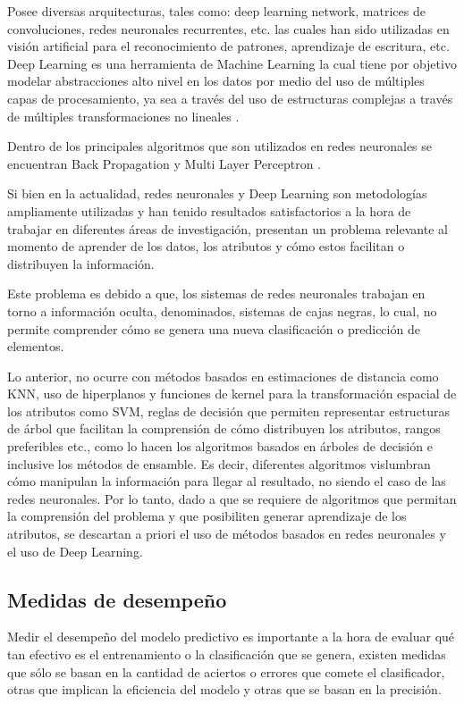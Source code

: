 Posee diversas arquitecturas, tales como: deep learning network, matrices de convoluciones, redes neuronales recurrentes, etc. las cuales han sido utilizadas en visión artificial para el reconocimiento de patrones, aprendizaje de escritura, etc. Deep Learning es una herramienta de Machine Learning la cual tiene por objetivo modelar abstracciones alto nivel en los datos por medio del uso de múltiples capas de procesamiento, ya sea a través del uso de estructuras complejas a través de múltiples transformaciones no lineales \cite{arel2010deep}.

Dentro de los principales algoritmos que son utilizados en redes neuronales se encuentran Back Propagation \cite{HECHTNIELSEN199265} y Multi Layer Perceptron \cite{80266}.

Si bien en la actualidad, redes neuronales y Deep Learning son metodologías ampliamente utilizadas y han tenido resultados satisfactorios a la hora de trabajar en diferentes áreas de investigación, presentan un problema relevante al momento de aprender de los datos, los atributos y cómo estos facilitan o distribuyen la información.

Este problema es debido a que, los sistemas de redes neuronales trabajan en torno a información oculta, denominados, sistemas de cajas negras, lo cual, no permite comprender cómo se genera una nueva clasificación o predicción de elementos. 

Lo anterior, no ocurre con métodos basados en estimaciones de distancia como KNN, uso de hiperplanos y funciones de kernel para la transformación espacial de los atributos como SVM, reglas de decisión que permiten representar estructuras de árbol que facilitan la comprensión de cómo distribuyen los atributos, rangos preferibles etc., como lo hacen los algoritmos basados en árboles de decisión e inclusive los métodos de ensamble. Es decir, diferentes algoritmos vislumbran cómo manipulan la información para llegar al resultado, no siendo el caso de las redes neuronales. Por lo tanto, dado a que se requiere de algoritmos que permitan la comprensión del problema y que posibiliten generar aprendizaje de los atributos, se descartan a priori el uso de métodos basados en redes neuronales y el uso de Deep Learning.


\subsection{Medidas de desempeño \label{desempeno}}

Medir el desempeño del modelo predictivo es importante a la hora de evaluar qué tan efectivo es el entrenamiento o la clasificación que se genera, existen medidas que sólo se basan en la cantidad de aciertos o errores que comete el clasificador, otras que implican la eficiencia del modelo y otras que se basan en la precisión.

